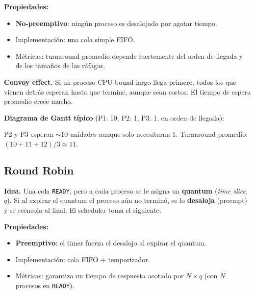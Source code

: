 \documentclass[11pt,a4paper]{article}
\begin{document}
\textbf{Propiedades:}

\begin{itemize}[leftmargin=*,nosep]
    \item \textbf{No-preemptivo}: ningún proceso es desalojado por
        agotar tiempo.
    \item Implementación: una cola simple FIFO.
    \item Métricas: turnaround promedio depende fuertemente del
        orden de llegada y de los tamaños de las ráfagas.
\end{itemize}

\textbf{Convoy effect.} Si un proceso CPU-bound largo llega primero,
todos los que vienen detrás esperan hasta que termine, aunque sean
cortos. El tiempo de espera promedio crece mucho.

\textbf{Diagrama de Gantt típico} (P1: 10, P2: 1, P3: 1, en orden de
llegada):

\begin{center}
\end{center}

\noindent P2 y P3 esperan $\sim 10$ unidades aunque solo necesitaran
$1$. Turnaround promedio: $(10 + 11 + 12)/3 \approx 11$.

\subsection*{Round Robin}

\textbf{Idea.} Una cola \texttt{READY}, pero a cada proceso se le
asigna un \textbf{quantum} (\emph{time slice}, $q$). Si al expirar el
quantum el proceso aún no terminó, se lo \textbf{desaloja} (preempt)
y se reencola al final. El scheduler toma el siguiente.

\textbf{Propiedades:}

\begin{itemize}[leftmargin=*,nosep]
    \item \textbf{Preemptivo}: el timer fuerza el desalojo al
        expirar el quantum.
    \item Implementación: cola FIFO + temporizador.
    \item Métricas: garantiza un tiempo de respuesta acotado por
        $N \times q$ (con $N$ procesos en \texttt{READY}).
\end{itemize}
\end{document}
